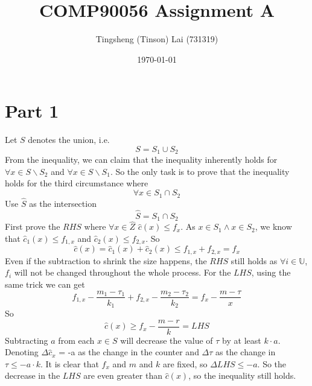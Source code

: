 \documentclass[a4paper]{article}
\title{\textbf{COMP90056 Assignment A}}
\author{Tingsheng (Tinson) Lai (731319)}
\date{\today}
\begin{document}
    \maketitle
    \section{Part 1}
    Let $S$ denotes the union, i.e. $$S = S_1 \cup S_2$$
    From the inequality, we can claim that the inequality inherently holds for $\forall x \in S \backslash S_2$ and $\forall x \in S \backslash S_1$. So the only task is to prove that the inequality holds for the third circumstance where $$\forall x \in S_1 \cap S_2$$
    Use $\hat{S}$ as the intersection $$\hat{S} = S_1 \cap S_2$$
    First prove the $RHS$ where $\forall x \in \hat{Z}$ $\hat{c} \left( x \right) \leq f_{x}$. As $x \in S_1 \wedge x \in S_2$, we know that $\hat{c}_1 \left( x \right) \leq f_{1,x}$ and $\hat{c}_2 \left( x \right) \leq f_{2,x}$. So $$\hat{c} \left( x \right) = \hat{c}_1 \left( x \right) + \hat{c}_2 \left( x \right) \leq f_{1,x} + f_{2,x} = f_{x}$$
    Even if the subtraction to shrink the size happens, the $RHS$ still holds as $\forall i \in \mathbb{U}$, $f_{i}$ will not be changed throughout the whole process. For the $LHS$, using the same trick we can get $$f_{1,x} - \frac{m_1 - \tau_1}{k_1} + f_{2,x} - \frac{m_2 - \tau_2}{k_2} = f_x - \frac{m - \tau}{x}$$ So $$\hat{c} \left( x \right) \geq f_x - \frac{m - r}{k} = LHS$$ Subtracting $a$ from each $x \in S$ will decrease the value of $\tau$ by at least $k \cdot a$. Denoting $\Delta \hat{c}_x$ = -a as the change in the counter and $\Delta \tau$ as the change in $\tau \leq -a \cdot k$. It is clear that $f_x$ and $m$ and $k$ are fixed, so $\Delta LHS \leq -a$. So the decrease in the $LHS$ are even greater than $\hat{c} \left( x \right)$, so the inequality still holds.
\end{document}
